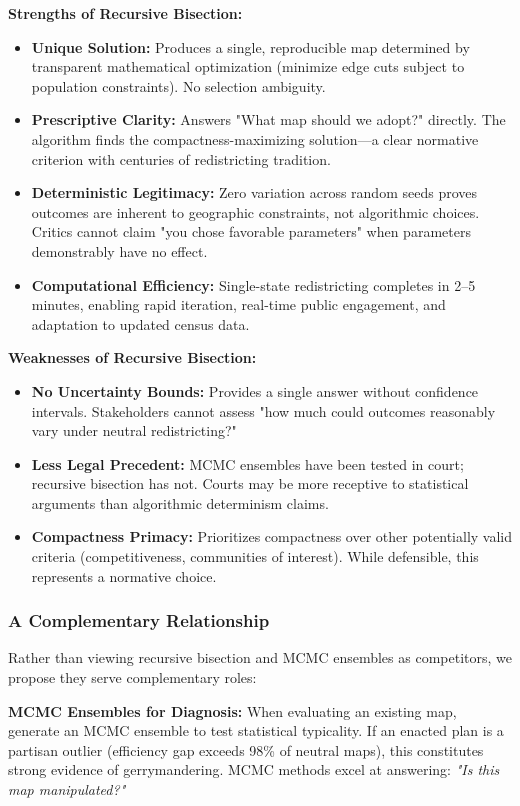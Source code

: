 \textbf{Strengths of Recursive Bisection:}
\begin{itemize}
\item \textbf{Unique Solution:} Produces a single, reproducible map determined by transparent mathematical optimization (minimize edge cuts subject to population constraints). No selection ambiguity.
\item \textbf{Prescriptive Clarity:} Answers "What map should we adopt?" directly. The algorithm finds the compactness-maximizing solution—a clear normative criterion with centuries of redistricting tradition.
\item \textbf{Deterministic Legitimacy:} Zero variation across random seeds proves outcomes are inherent to geographic constraints, not algorithmic choices. Critics cannot claim "you chose favorable parameters" when parameters demonstrably have no effect.
\item \textbf{Computational Efficiency:} Single-state redistricting completes in 2--5 minutes, enabling rapid iteration, real-time public engagement, and adaptation to updated census data.
\end{itemize}

\textbf{Weaknesses of Recursive Bisection:}
\begin{itemize}
\item \textbf{No Uncertainty Bounds:} Provides a single answer without confidence intervals. Stakeholders cannot assess "how much could outcomes reasonably vary under neutral redistricting?"
\item \textbf{Less Legal Precedent:} MCMC ensembles have been tested in court; recursive bisection has not. Courts may be more receptive to statistical arguments than algorithmic determinism claims.
\item \textbf{Compactness Primacy:} Prioritizes compactness over other potentially valid criteria (competitiveness, communities of interest). While defensible, this represents a normative choice.
\end{itemize}

\subsubsection{A Complementary Relationship}

Rather than viewing recursive bisection and MCMC ensembles as competitors, we propose they serve complementary roles:

\textbf{MCMC Ensembles for Diagnosis:} When evaluating an existing map, generate an MCMC ensemble to test statistical typicality. If an enacted plan is a partisan outlier (efficiency gap exceeds 98\% of neutral maps), this constitutes strong evidence of gerrymandering. MCMC methods excel at answering: \textit{"Is this map manipulated?"}

